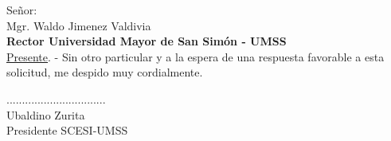 \documentclass[xcolor, x11names, letterpaper, 12pt]{letter}
\begin{document}
\begin{letter}{
    Señor: \\
    Mgr. Waldo Jimenez Valdivia\\
    \textbf{Rector Universidad Mayor de San Sim\'on - UMSS}\\
    \underline {Presente}. -
}
Sin otro particular y a la espera de una respuesta favorable a esta solicitud, 
me despido muy cordialmente.

\vspace{1.4cm}

\begin{center}
................................\\
Ubaldino Zurita \\
Presidente SCESI-UMSS \\
\end{center}
\end{letter}\textsc{}
\end{document}
